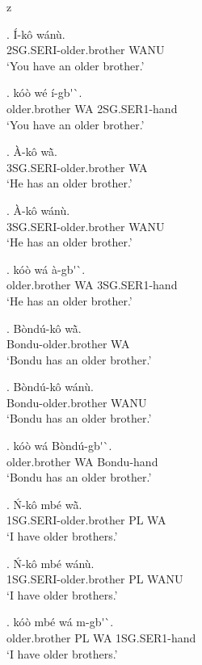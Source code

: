 z   \documentclass{assets/fieldnotes}
\begin{document}
\exg. \'{I}-k\^{o} w\'{a}n\`{u}. \\
2SG.SERI-older.brother WANU \\
`You have an older brother.' 

\exg. k\'{o}\`{o} w\'{e} \'{i}-gb\'{}\`{}. \\
older.brother WA 2SG.SER1-hand \\
`You have an older brother.' 

\exg. \`{A}-k\^{o} wã̀. \\
3SG.SERI-older.brother WA \\
`He has an older brother.'

\exg. \`{A}-k\^{o} w\'{a}n\`{u}. \\
3SG.SERI-older.brother WANU \\
`He has an older brother.' 

\exg. k\'{o}\`{o} w\'{a} \`{a}-gb\'{}\`{}. \\
older.brother WA 3SG.SER1-hand \\
`He has an older brother.' 

\exg. B\`{o}nd\'{u}-k\^{o} wã̀. \\
Bondu-older.brother WA \\
`Bondu has an older brother.'

\exg. B\`{o}nd\'{u}-k\^{o} w\'{a}n\`{u}. \\
Bondu-older.brother WANU \\
`Bondu has an older brother.' 

\exg. k\'{o}\`{o} w\'{a}  B\`{o}nd\'{u}-gb\'{}\`{}. \\
older.brother WA Bondu-hand \\
`Bondu has an older brother.' 


\exg. \'{N}-k\^{o} mb\'{e} wã̀. \\
1SG.SERI-older.brother PL WA \\
`I have older brothers.' 

\exg. \'{N}-k\^{o} mb\'{e} w\'{a}n\`{u}. \\
1SG.SERI-older.brother PL WANU \\
`I have older brothers.' 

\exg. k\'{o}\`{o} mb\'{e} w\'{a} m-gb\'{}\`{}. \\
older.brother PL WA 1SG.SER1-hand \\
`I have older brothers.' 
\end{document}
